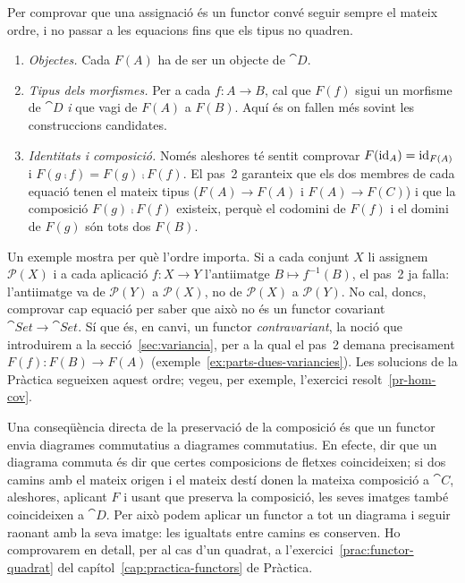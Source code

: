 \begin{observacio}\label{obs:comprovar-tipus}
Per comprovar que una assignació és un functor convé seguir sempre el mateix ordre, i no passar a les equacions fins que els tipus no quadren.
\begin{enumerate}
\item \emph{Objectes.} Cada $F(A)$ ha de ser un objecte de $\cat{D}$.
\item \emph{Tipus dels morfismes.} Per a cada $f\colon A\to B$, cal que $F(f)$ sigui un morfisme de $\cat{D}$ \emph{i} que vagi de $F(A)$ a $F(B)$. Aquí és on fallen més sovint les construccions candidates.
\item \emph{Identitats i composició.} Només aleshores té sentit comprovar $F(\operatorname{id}_A)=\operatorname{id}_{F(A)}$ i $F(g\comp f)=F(g)\comp F(f)$. El pas~2 garanteix que els dos membres de cada equació tenen el mateix tipus ($F(A)\to F(A)$ i $F(A)\to F(C)$) i que la composició $F(g)\comp F(f)$ existeix, perquè el codomini de $F(f)$ i el domini de $F(g)$ són tots dos $F(B)$.
\end{enumerate}
Un exemple mostra per què l'ordre importa. Si a cada conjunt $X$ li assignem $\mathcal P(X)$ i a cada aplicació $f\colon X\to Y$ l'antiimatge $B\mapsto f^{-1}(B)$, el pas~2 ja falla: l'antiimatge va de $\mathcal P(Y)$ a $\mathcal P(X)$, no de $\mathcal P(X)$ a $\mathcal P(Y)$. No cal, doncs, comprovar cap equació per saber que això no és un functor covariant $\cat{Set}\to\cat{Set}$. Sí que és, en canvi, un functor \emph{contravariant}, la noció que introduirem a la secció~\ref{sec:variancia}, per a la qual el pas~2 demana precisament $F(f)\colon F(B)\to F(A)$ (exemple~\ref{ex:parts-dues-variancies}). Les solucions de la Pràctica segueixen aquest ordre; vegeu, per exemple, l'exercici resolt~\ref{pr-hom-cov}.
\end{observacio}

\begin{observacio}
Una conseqüència directa de la preservació de la composició és que un functor envia diagrames commutatius a diagrames commutatius. En efecte, dir que un diagrama commuta és dir que certes composicions de fletxes coincideixen; si dos camins amb el mateix origen i el mateix destí donen la mateixa composició a $\cat{C}$, aleshores, aplicant $F$ i usant que preserva la composició, les seves imatges també coincideixen a $\cat{D}$. Per això podem aplicar un functor a tot un diagrama i seguir raonant amb la seva imatge: les igualtats entre camins es conserven. Ho comprovarem en detall, per al cas d'un quadrat, a l'exercici~\ref{prac:functor-quadrat} del capítol~\ref{cap:practica-functors} de Pràctica.
\end{observacio}

